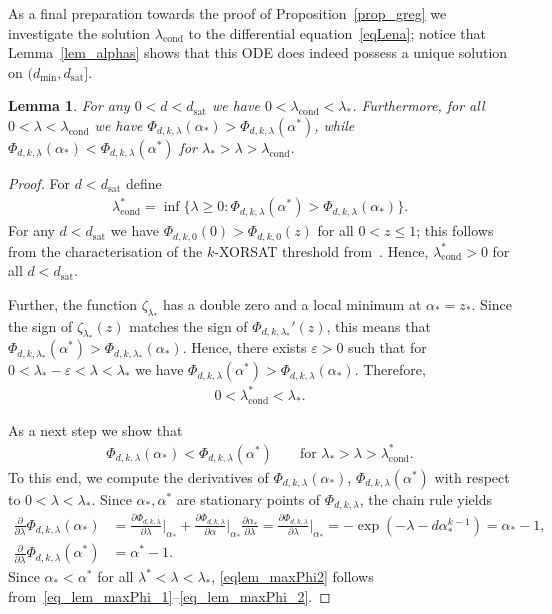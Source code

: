 \documentclass[10pt,reqno]{amsart}
\numberwithin{equation}{section}
\newcommand\dmin{d_{\mathrm{min}}}
\newcommand\dsat{d_{\mathrm{sat}}}
\newcommand{\lcond}{\lambda_{\mathrm{cond}}}
\newcommand\eps{\varepsilon}
\newcommand\Lem{Lemma}
\newcommand\Prop{Proposition}
\newcommand\Thm{Theorem}
\newtheorem{lemma}[definition]{Lemma}
\newcommand{\Ph}{\Phi_{d,k,\lambda}}
\begin{document}
As a final preparation towards the proof of \Prop~\ref{prop_greg} we investigate the solution $\lcond$ to the differential equation~\eqref{eqLena}; notice that \Lem~\ref{lem_alphas} shows that this ODE does indeed possess a unique solution on $(\dmin,\dsat]$.

\begin{lemma}\label{lem_maxPhi}
	For any $0<d<\dsat$ we have $0<\lcond<\lambda_*$.
	Furthermore, for all $0<\lambda<\lcond$ we have $\Phi_{d,k,\lambda}(\alpha_*)>\Phi_{d,k,\lambda}(\alpha^*)$, while $\Phi_{d,k,\lambda}(\alpha_*)<\Phi_{d,k,\lambda}(\alpha^*)$ for $\lambda_*>\lambda>\lcond$. 
\end{lemma}
\begin{proof}
	For $d<\dsat$ define 
	\begin{align}\label{eqlem_maxPhi0}
		\lcond^*=\inf\{\lambda\geq0:\Phi_{d,k,\lambda}(\alpha^*)>\Phi_{d,k,\lambda}(\alpha_*)\}.
	\end{align}
	For any $d<\dsat$ we have $\Phi_{d,k,0}(0)>\Phi_{d,k,0}(z)$ for all $0<z\leq1$; this follows from the characterisation of the $k$-XORSAT threshold from~\cite[\Thm~1.1]{Ayre}.
	Hence, $\lcond^*>0$ for all $d<\dsat$.

	Further, the function $\zeta_{\lambda_*}$ has a double zero and a local minimum at $\alpha_*=z_*$.
	Since the sign of $\zeta_{\lambda_*}(z)$ matches the sign of $\Phi_{d,k,\lambda_*}'(z)$, this means that $\Phi_{d,k,\lambda_*}(\alpha^*)>\Phi_{d,k,\lambda_*}(\alpha_*)$.
	Hence, there exists $\eps>0$ such that for $0<\lambda_*-\eps<\lambda<\lambda_*$ we have $\Phi_{d,k,\lambda}(\alpha^*)>\Phi_{d,k,\lambda}(\alpha_*)$.
	Therefore,
	\begin{align}\label{eqlem_maxPhi1}
		0<\lcond^*<\lambda_*.
	\end{align}

	As a next step we show that 
\begin{align}\label{eqlem_maxPhi2}
	\Phi_{d,k,\lambda}(\alpha_*)<\Phi_{d,k,\lambda}(\alpha^*)&&\mbox{ for $\lambda_*>\lambda>\lcond^*$}.
	\end{align}
	To this end, we compute the derivatives of $\Ph(\alpha_*)$, $\Ph(\alpha^*)$ with respect to $0<\lambda<\lambda_*$.
	Since $\alpha_*,\alpha^*$ are stationary points of $\Ph$, the chain rule yields
	\begin{align}\label{eq_lem_maxPhi_1}
		\frac\partial{\partial\lambda}\Ph(\alpha_*)&=\frac{\partial\Ph}{\partial\lambda}\big|_{\alpha_*}+\frac{\partial\Ph}{\partial\alpha}\big|_{\alpha_*}\frac{\partial\alpha_*}{\partial\lambda}=\frac{\partial\Ph}{\partial\lambda}\big|_{\alpha_*}=-\exp(-\lambda-d\alpha_*^{k-1})=\alpha_*-1,\\
		\frac\partial{\partial\lambda}\Ph(\alpha^*)&=\alpha^*-1.\label{eq_lem_maxPhi_2}
	\end{align}
	Since $\alpha_*<\alpha^*$ for all $\lambda^*<\lambda<\lambda_*$, \eqref{eqlem_maxPhi2} follows from~\eqref{eq_lem_maxPhi_1}--\eqref{eq_lem_maxPhi_2}.


\end{proof}
\end{document}

